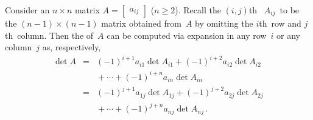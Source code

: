 \begin{theorem} \label{thm:letdet} 
Consider an \(n\times n\) matrix \(A=\begin{bmatrix} a_{ij} \end{bmatrix}\) (\(n\geq2\)). 
Recall the \((i,j)\)th~ \(A_{ij}\)~to be the \((n-1)\times(n-1)\) matrix obtained from~\(A\) by omitting the \(i\)th~row and \(j\)th~column.  Then the  of~\(A\) can be computed via expansion in any row~\(i\) or any column~\(j\) as, respectively,
\begin{eqnarray}
\det A
&=&(-1)^{i+1}a_{i1}\det A_{i1}
+(-1)^{i+2}a_{i2}\det A_{i2}
\nonumber\\&&{}
+\cdots+(-1)^{i+n}a_{in}\det A_{in}
\nonumber\\&=&(-1)^{j+1}a_{1j}\det A_{1j}
+(-1)^{j+2}a_{2j}\det A_{2j}
\nonumber\\&&{}
+\cdots+(-1)^{j+n}a_{nj}\det A_{nj}\,.
\label{eq:detlet}
\end{eqnarray}
\end{theorem}
